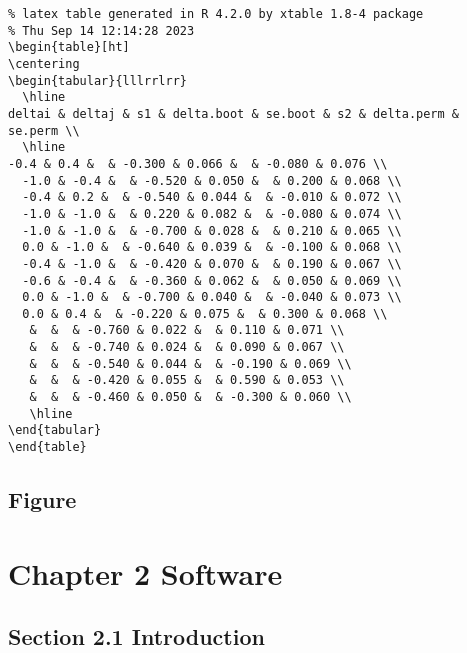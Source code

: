 \documentclass[12pt]{article}
\begin{document}
\begin{verbatim}
% latex table generated in R 4.2.0 by xtable 1.8-4 package
% Thu Sep 14 12:14:28 2023
\begin{table}[ht]
\centering
\begin{tabular}{lllrrlrr}
  \hline
deltai & deltaj & s1 & delta.boot & se.boot & s2 & delta.perm & se.perm \\ 
  \hline
-0.4 & 0.4 &  & -0.300 & 0.066 &  & -0.080 & 0.076 \\ 
  -1.0 & -0.4 &  & -0.520 & 0.050 &  & 0.200 & 0.068 \\ 
  -0.4 & 0.2 &  & -0.540 & 0.044 &  & -0.010 & 0.072 \\ 
  -1.0 & -1.0 &  & 0.220 & 0.082 &  & -0.080 & 0.074 \\ 
  -1.0 & -1.0 &  & -0.700 & 0.028 &  & 0.210 & 0.065 \\ 
  0.0 & -1.0 &  & -0.640 & 0.039 &  & -0.100 & 0.068 \\ 
  -0.4 & -1.0 &  & -0.420 & 0.070 &  & 0.190 & 0.067 \\ 
  -0.6 & -0.4 &  & -0.360 & 0.062 &  & 0.050 & 0.069 \\ 
  0.0 & -1.0 &  & -0.700 & 0.040 &  & -0.040 & 0.073 \\ 
  0.0 & 0.4 &  & -0.220 & 0.075 &  & 0.300 & 0.068 \\ 
   &  &  & -0.760 & 0.022 &  & 0.110 & 0.071 \\ 
   &  &  & -0.740 & 0.024 &  & 0.090 & 0.067 \\ 
   &  &  & -0.540 & 0.044 &  & -0.190 & 0.069 \\ 
   &  &  & -0.420 & 0.055 &  & 0.590 & 0.053 \\ 
   &  &  & -0.460 & 0.050 &  & -0.300 & 0.060 \\ 
   \hline
\end{tabular}
\end{table}
\end{verbatim}

\subsection{Figure}
\label{sec:orgbe25cab}

\section{Chapter 2 Software}
\label{sec:orgdb4804f}
\subsection{Section 2.1 Introduction}
\label{sec:org53cd7d6}
\end{document}
